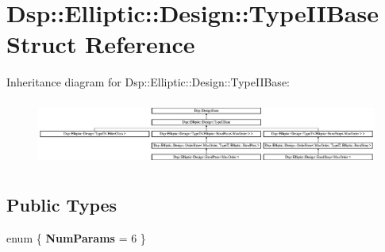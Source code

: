 \hypertarget{structDsp_1_1Elliptic_1_1Design_1_1TypeIIBase}{\section{Dsp\-:\-:Elliptic\-:\-:Design\-:\-:Type\-I\-I\-Base Struct Reference}
\label{structDsp_1_1Elliptic_1_1Design_1_1TypeIIBase}
}
Inheritance diagram for Dsp\-:\-:Elliptic\-:\-:Design\-:\-:Type\-I\-I\-Base\-:\begin{figure}[H]
\begin{center}
\leavevmode
\includegraphics[height=2.165507cm]{structDsp_1_1Elliptic_1_1Design_1_1TypeIIBase}
\end{center}
\end{figure}
\subsection*{Public Types}
\begin{DoxyCompactItemize}
\item 
enum \{ {\bfseries Num\-Params} =  6
 \}
\end{DoxyCompactItemize}
